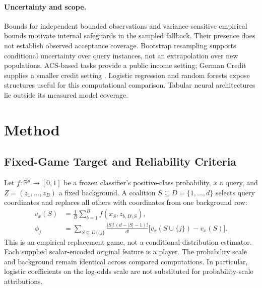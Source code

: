 \documentclass{article}
\begin{document}
\paragraph{Uncertainty and scope.}
Bounds for independent bounded observations \citep{Hoeffding1963} and variance-sensitive empirical bounds \citep{Maurer2009} motivate internal safeguards in the sampled fallback. Their presence does not establish observed acceptance coverage. Bootstrap resampling \citep{Efron1979} supports conditional uncertainty over query instances, not an extrapolation over new populations. ACS-based tasks \citep{Ding2021} provide a public income setting; German Credit supplies a smaller credit setting \citep{GermanCredit}. Logistic regression \citep{Hosmer2013} and random forests \citep{Breiman2001} expose structures useful for this computational comparison. Tabular neural architectures \citep{Gorishniy2021} lie outside its measured model coverage.

\section{Method}
\subsection{Fixed-Game Target and Reliability Criteria}
Let $f:\mathbb{R}^d\rightarrow[0,1]$ be a frozen classifier's positive-class probability, $x$ a query, and $Z=(z_1,\ldots,z_B)$ a fixed background. A coalition $S\subseteq D=\{1,\ldots,d\}$ selects query coordinates and replaces all others with coordinates from one background row:
\begin{align}
 v_x(S)&=\frac{1}{B}\sum_{b=1}^B f(x_S,z_{b,D\setminus S}), \\
 \phi_j&=\sum_{S\subseteq D\setminus\{j\}}\frac{|S|!\,(d-|S|-1)!}{d!}
       \big[v_x(S\cup\{j\})-v_x(S)\big]. \label{eq:shapley}
\end{align}
This is an empirical replacement game, not a conditional-distribution estimator. Each supplied scalar-encoded original feature is a player. The probability scale and background remain identical across compared computations. In particular, logistic coefficients on the log-odds scale are not substituted for probability-scale attributions.
\end{document}
